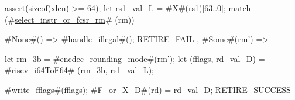 assert(sizeof(xlen) >= 64);
let rs1_val_L = #\hyperref[sailRISCVzX]{X}#(rs1)[63..0];
match (#\hyperref[sailRISCVzselectzyinstrzyorzyfcsrzyrm]{select\_instr\_or\_fcsr\_rm}# (rm)) {
  #\hyperref[sailRISCVzNone]{None}#() => { #\hyperref[sailRISCVzhandlezyillegal]{handle\_illegal}#(); RETIRE_FAIL },
  #\hyperref[sailRISCVzSome]{Some}#(rm') => {
    let rm_3b = #\hyperref[sailRISCVzencdeczyroundingzymode]{encdec\_rounding\_mode}#(rm');
    let (fflags, rd_val_D) = #\hyperref[sailRISCVzriscvzyi64ToF64]{riscv\_i64ToF64}# (rm_3b, rs1_val_L);

    #\hyperref[sailRISCVzwritezyfflags]{write\_fflags}#(fflags);
    #\hyperref[sailRISCVzFzyorzyXzyD]{F\_or\_X\_D}#(rd) = rd_val_D;
    RETIRE_SUCCESS
  }
}
